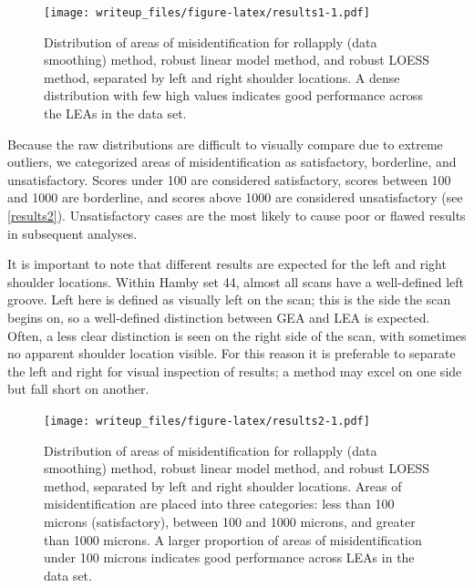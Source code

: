 \documentclass[12pt]{article}
\begin{document}
\begin{figure}
\centering
\texttt{[image: writeup\_files/figure-latex/results1-1.pdf]}
\caption{\label{results1}Distribution of areas of misidentification for
rollapply (data smoothing) method, robust linear model method, and
robust LOESS method, separated by left and right shoulder locations. A
dense distribution with few high values indicates good performance
across the LEAs in the data set.}
\end{figure}

Because the raw distributions are difficult to visually compare due to
extreme outliers, we categorized areas of misidentification as
satisfactory, borderline, and unsatisfactory. Scores under 100 are
considered satisfactory, scores between 100 and 1000 are borderline, and
scores above 1000 are considered unsatisfactory (see
\autoref{results2}). Unsatisfactory cases are the most likely to cause
poor or flawed results in subsequent analyses.

It is important to note that different results are expected for the left
and right shoulder locations. Within Hamby set 44, almost all scans have
a well-defined left groove. Left here is defined as visually left on the
scan; this is the side the scan begins on, so a well-defined distinction
between GEA and LEA is expected. Often, a less clear distinction is seen
on the right side of the scan, with sometimes no apparent shoulder
location visible. For this reason it is preferable to separate the left
and right for visual inspection of results; a method may excel on one
side but fall short on another.

\begin{figure}
\centering
\texttt{[image: writeup\_files/figure-latex/results2-1.pdf]}
\caption{\label{results2}Distribution of areas of misidentification for
rollapply (data smoothing) method, robust linear model method, and
robust LOESS method, separated by left and right shoulder locations.
Areas of misidentification are placed into three categories: less than
100 microns (satisfactory), between 100 and 1000 microns, and greater
than 1000 microns. A larger proportion of areas of misidentification
under 100 microns indicates good performance across LEAs in the data
set.}
\end{figure}
\end{document}
